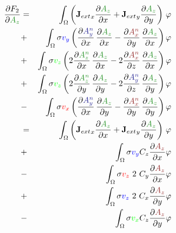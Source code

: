 \documentclass[smallextended]{svjour3}       %
\begin{document}
			\begin{eqnarray}
			\frac{\partial F_2}{\partial \textcolor{darkgre}{A_z}} & = &
			\int_{\Omega} \left({\mathbf{J}_{ext}}_x \frac{\partial \textcolor{darkgre}{A_z}}{\partial x} + {\mathbf{J}_{ext}}_y \frac{\partial \textcolor{darkgre}{A_z}}{\partial y}\right)\, \varphi		
			\nonumber \\
			& + &\int_{\Omega} \sigma \textcolor{blu}{v_y} \left(
			\frac{\partial \textcolor{darkblu}{A_y^n}}{\partial x}\,\frac{\partial \textcolor{darkgre}{A_z}}{\partial x}
			- \frac{\partial \textcolor{darkred}{A_x^n}}{\partial y}\,\frac{\partial \textcolor{darkgre}{A_z}}{\partial x}
							\right) \varphi \nonumber \\			
			& + &\int_{\Omega} \sigma \textcolor{gre}{v_z} \left(
			2 \frac{\partial \textcolor{darkgre}{A_z^n}}{\partial x}\,\frac{\partial \textcolor{darkgre}{A_z}}{\partial x}
			- 2 \frac{\partial \textcolor{darkred}{A_x^n}}{\partial z}\,\frac{\partial \textcolor{darkgre}{A_z}}{\partial x}
				\right) \varphi \nonumber \\		
			& + &\int_{\Omega} \sigma \textcolor{gre}{v_z} \left(
			2 \frac{\partial \textcolor{darkgre}{A_z^n}}{\partial y}\,\frac{\partial \textcolor{darkgre}{A_z}}{\partial y}
			- 2 \frac{\partial \textcolor{darkblu}{A_y^n}}{\partial z}\,\frac{\partial \textcolor{darkgre}{A_z}}{\partial y}
				\right) \varphi \nonumber \\			
			& - &\int_{\Omega} \sigma \textcolor{red}{v_x} \left(
			\frac{\partial \textcolor{darkblu}{A_y^n}}{\partial x}\,\frac{\partial \textcolor{darkgre}{A_z}}{\partial y}
			- \frac{\partial \textcolor{darkred}{A_x^n}}{\partial y}\,\frac{\partial \textcolor{darkgre}{A_z}}{\partial y}
				\right) \varphi \nonumber \\		
			 & = &
			\int_{\Omega} \left({\mathbf{J}_{ext}}_x \frac{\partial \textcolor{darkgre}{A_z}}{\partial x} + {\mathbf{J}_{ext}}_y \frac{\partial \textcolor{darkgre}{A_z}}{\partial y}\right)\, \varphi		
			\nonumber \\
			& + &\int_{\Omega} \sigma  \textcolor{blu}{v_y}    C_z \frac{\partial \textcolor{darkred}{A_z}}{\partial x} \varphi \nonumber \\			
			& - &\int_{\Omega} \sigma  \textcolor{red}{v_z}\ 2\ C_y \frac{\partial \textcolor{darkred}{A_z}}{\partial x} \varphi \nonumber \\			
			& + & \int_{\Omega} \sigma \textcolor{blu}{v_z}\ 2\ C_x \frac{\partial \textcolor{darkred}{A_z}}{\partial y} \varphi \nonumber \\			
			& - & \int_{\Omega} \sigma \textcolor{gre}{v_x}  C_z \frac{\partial \textcolor{darkred}{A_z}}{\partial y}  \varphi
		\end{eqnarray}
		
\end{document}
